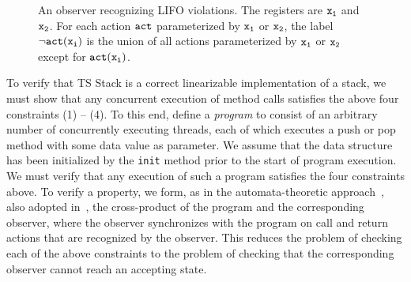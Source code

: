 \begin{figure}
\caption{An observer recognizing LIFO violations. The registers are $\tt x_1$ and $\tt x_2$. For each action $\tt act$ parameterized by $\tt x_1$ or $\tt x_2$, the label $\tt \neg act(x_i)$ is the union of  all actions parameterized by $\tt x_1$ or $\tt x_2$ except for $\tt act(x_i)$.  
}
\label{fig:lifostack:fig}
\end{figure}

To verify that TS Stack is a correct linearizable implementation of a stack, we
must show that any concurrent execution of method calls satisfies the
above four constraints (1) -- (4).
To this end, define a {\em program} to consist 
of an arbitrary number of concurrently executing threads,
%
each of which executes a push or pop method with some data value as parameter.
We assume that the data structure has been initialized
by the {\tt init} method prior to the start of program execution.
We must verify that any execution of such a program satisfies the four
constraints above. To verify a property, 
we form, as in the automata-theoretic approach~\cite{VW:modelchecking},
also adopted in~\cite{AHHR:integrated},
the cross-product of the program  and the corresponding
observer, where the observer synchronizes with the program on call and
return actions that are recognized by the observer. This reduces the
problem of checking each of the above constraints to the problem of checking
that the corresponding observer cannot reach an accepting state.

